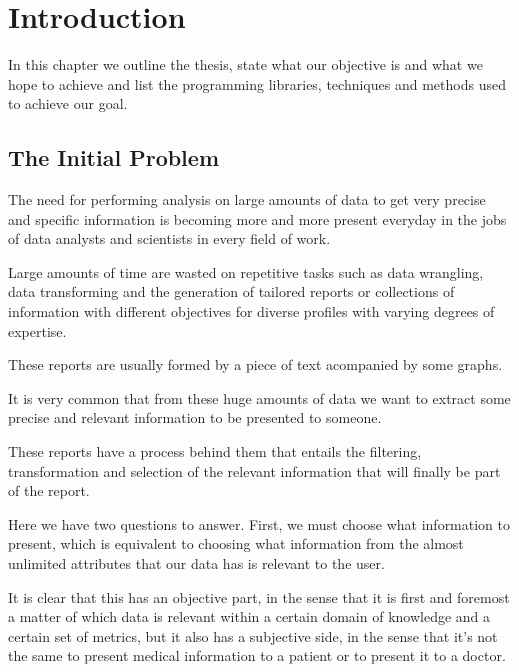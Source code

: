 %
%

\chapter{Introduction}

\begin{resumen}
In this chapter we outline the thesis, state what our objective is and what we hope to achieve and list the programming libraries, techniques and methods used to achieve our goal.
\end{resumen}
\linespread{1.6}

\section{The Initial Problem}
\label{cap1:sec:problem}

The need for performing analysis on large amounts of data to get very precise and specific information is becoming more and more present everyday in the jobs of data analysts and scientists in every field of work.

Large amounts of time are wasted on repetitive tasks such as data wrangling, data transforming and the generation of tailored reports or collections of information with different objectives for diverse profiles with varying degrees of expertise.

These reports are usually formed by a piece of text acompanied by some graphs.

It is very common that from these huge amounts of data we want to extract some precise and relevant information to be presented to someone.

These reports have a process behind them that entails the filtering, transformation and selection of the relevant information that will finally be part of the report.

Here we have two questions to answer. First, we must choose what information to present, which is equivalent to choosing what information from the almost unlimited attributes that our data has is relevant to the user. 

It is clear that this has an objective part, in the sense that it is first and foremost a matter of which data is relevant within a certain domain of knowledge and a certain set of metrics, but it also has a subjective side, in the sense that it's not the same to present medical information to a patient or to present it to a doctor. 

